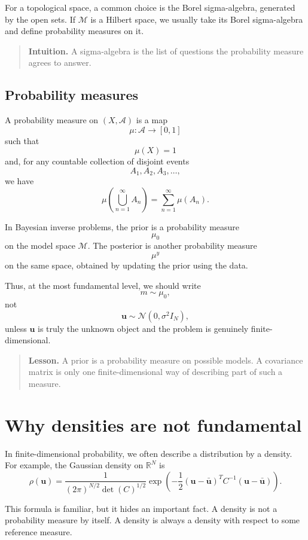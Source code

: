 \documentclass[11pt,a4paper]{book}
\newenvironment{intuition}
  {\begin{quote}\textbf{Intuition.}}
  {\end{quote}}
\newenvironment{lesson}
  {\begin{quote}\textbf{Lesson.}}
  {\end{quote}}
\newcommand{\M}{\mathcal{M}}      %
\newcommand{\R}{\mathbb{R}}
\newcommand{\prior}{\mu_0}
\newcommand{\post}{\mu^y}
\begin{document}
For a topological space, a common choice is the Borel sigma-algebra, generated
by the open sets. If $\M$ is a Hilbert space, we usually take its Borel
sigma-algebra and define probability measures on it.

\begin{intuition}
A sigma-algebra is the list of questions the probability measure agrees to
answer.
\end{intuition}

\subsection{Probability measures}

A probability measure on $(X,\mathcal{A})$ is a map
\[
    \mu:\mathcal{A}\to[0,1]
\]
such that
\[
    \mu(X)=1
\]
and, for any countable collection of disjoint events
\[
    A_1,A_2,A_3,\ldots,
\]
we have
\[
    \mu\left(\bigcup_{n=1}^{\infty}A_n\right)
    =
    \sum_{n=1}^{\infty}\mu(A_n).
\]

In Bayesian inverse problems, the prior is a probability measure
\[
    \prior
\]
on the model space $\M$. The posterior is another probability measure
\[
    \post
\]
on the same space, obtained by updating the prior using the data.

Thus, at the most fundamental level, we should write
\[
    m\sim\prior,
\]
not
\[
    \bm{u}\sim\mathcal{N}(0,\sigma^2 I_N),
\]
unless $\bm{u}$ is truly the unknown object and the problem is genuinely
finite-dimensional.

\begin{lesson}
A prior is a probability measure on possible models.
A covariance matrix is only one finite-dimensional way of describing part of
such a measure.
\end{lesson}

\section{Why densities are not fundamental}

In finite-dimensional probability, we often describe a distribution by a
density. For example, the Gaussian density on $\R^N$ is
\[
    \rho(\bm{u})
    =
    \frac{1}{(2\pi)^{N/2}\det(C)^{1/2}}
    \exp
    \left(
        -
        \frac{1}{2}
        (\bm{u}-\bar{\bm{u}})^T C^{-1}
        (\bm{u}-\bar{\bm{u}})
    \right).
\]

This formula is familiar, but it hides an important fact. A density is not a
probability measure by itself. A density is always a density with respect to
some reference measure.
\end{document}
